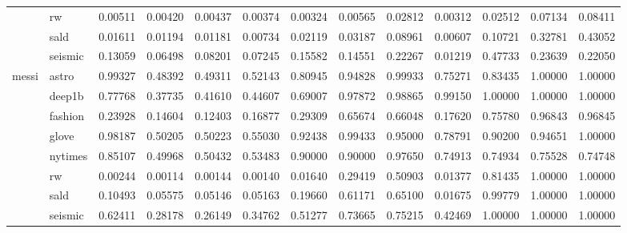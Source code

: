 \begin{tabular}{llrrrrrrrrrrr}
 & rw & 0.00511 & 0.00420 & 0.00437 & 0.00374 & 0.00324 & 0.00565 & 0.02812 & 0.00312 & 0.02512 & 0.07134 & 0.08411 \\
 & sald & 0.01611 & 0.01194 & 0.01181 & 0.00734 & 0.02119 & 0.03187 & 0.08961 & 0.00607 & 0.10721 & 0.32781 & 0.43052 \\
 & seismic & 0.13059 & 0.06498 & 0.08201 & 0.07245 & 0.15582 & 0.14551 & 0.22267 & 0.01219 & 0.47733 & 0.23639 & 0.22050 \\
\cline{1-13}
\multirow[t]{8}{*}{messi} & astro & 0.99327 & 0.48392 & 0.49311 & 0.52143 & 0.80945 & 0.94828 & 0.99933 & 0.75271 & 0.83435 & 1.00000 & 1.00000 \\
 & deep1b & 0.77768 & 0.37735 & 0.41610 & 0.44607 & 0.69007 & 0.97872 & 0.98865 & 0.99150 & 1.00000 & 1.00000 & 1.00000 \\
 & fashion & 0.23928 & 0.14604 & 0.12403 & 0.16877 & 0.29309 & 0.65674 & 0.66048 & 0.17620 & 0.75780 & 0.96843 & 0.96845 \\
 & glove & 0.98187 & 0.50205 & 0.50223 & 0.55030 & 0.92438 & 0.99433 & 0.95000 & 0.78791 & 0.90200 & 0.94651 & 1.00000 \\
 & nytimes & 0.85107 & 0.49968 & 0.50432 & 0.53483 & 0.90000 & 0.90000 & 0.97650 & 0.74913 & 0.74934 & 0.75528 & 0.74748 \\
 & rw & 0.00244 & 0.00114 & 0.00144 & 0.00140 & 0.01640 & 0.29419 & 0.50903 & 0.01377 & 0.81435 & 1.00000 & 1.00000 \\
 & sald & 0.10493 & 0.05575 & 0.05146 & 0.05163 & 0.19660 & 0.61171 & 0.65100 & 0.01675 & 0.99779 & 1.00000 & 1.00000 \\
 & seismic & 0.62411 & 0.28178 & 0.26149 & 0.34762 & 0.51277 & 0.73665 & 0.75215 & 0.42469 & 1.00000 & 1.00000 & 1.00000 \\
\cline{1-13}
\bottomrule
\end{tabular}

